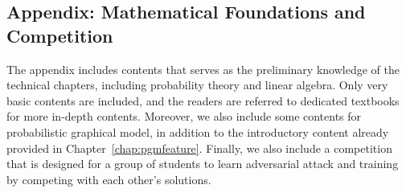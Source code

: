%
%
%

\appendix

\begin{partbacktext}
\part{Appendix: Mathematical Foundations and Competition}\label{part:math}


The appendix includes contents that serves as the preliminary knowledge of the technical chapters, including probability theory and linear algebra. Only very basic contents are included, and the readers are referred to dedicated textbooks for more in-depth contents. 
Moreover, we also include some contents for probabilistic graphical model, in addition to the introductory content already provided in Chapter~\ref{chap:pgmfeature}. 
Finally, we also include a competition that is designed for a group of students to learn adversarial attack and training by competing with each other's solutions. 
\end{partbacktext}









